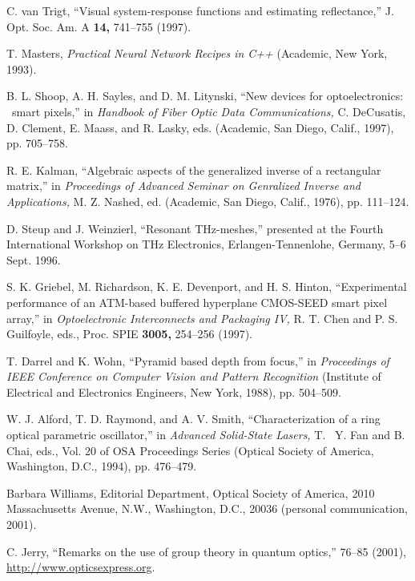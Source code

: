 \documentclass[letterpaper,11pt]{article}   %
\begin{document}
\begin{thebibliography}{99}

C. van Trigt, ``Visual system-response functions and estimating reflectance,'' %
J. Opt. Soc. Am. A {\bf 14,} 741--755 (1997).

T. Masters, {\it Practical Neural Network Recipes in C++} (Academic,
New York, 1993).

B. L. Shoop, A. H. Sayles, and D. M. Litynski, ``New devices for
optoelectronics:  \ smart pixels,'' in {\it Handbook of Fiber
Optic Data Communications,} C. DeCusatis, D. Clement, E. Maass,
and R. Lasky, eds. (Academic, San Diego, Calif., 1997), pp.
705--758.

R. E. Kalman, ``Algebraic aspects of the generalized inverse of a
rectangular matrix,'' in {\it Proceedings of Advanced Seminar on
Genralized Inverse and Applications,} M. Z. Nashed, ed. (Academic,
San Diego, Calif., 1976), pp. 111--124.

D. Steup and J. Weinzierl, ``Resonant THz-meshes,'' presented at the
Fourth International Workshop on THz Electronics,
Erlangen-Tennenlohe, Germany, 5--6 Sept. 1996.

 S. K. Griebel, M. Richardson, K. E. Devenport, and H. S. Hinton,
``Experimental performance of an ATM-based buffered hyperplane
CMOS-SEED smart pixel array,'' in {\it Optoelectronic
Interconnects and Packaging IV,} R. T. Chen and P. S. Guilfoyle,
eds., Proc. SPIE {\bf 3005,} 254--256 (1997).

T. Darrel and K. Wohn, ``Pyramid based depth from focus,'' in
{\it Proceedings of IEEE Conference on Computer Vision and Pattern
Recognition} (Institute of Electrical and Electronics Engineers,
New York, 1988), pp. 504--509.

 W. J. Alford, T. D. Raymond, and A. V. Smith, ``Characterization of a ring optical
parametric oscillator,'' in {\it Advanced Solid-State Lasers,} T.~
Y. Fan and B. Chai, eds., Vol. 20 of OSA Proceedings Series
(Optical Society of America, Washington, D.C., 1994), pp.
476--479.

Barbara Williams, Editorial Department, Optical Society of
America, 2010 Massa\-chusetts Avenue, N.W., Washington, D.C.,
20036 (personal communication, 2001).

C. Jerry, ``Remarks on the use of group
theory in quantum optics,''  76--85 (2001),
\href{http://www.opticsexpress.org}{http://www.opticsexpress.org}.

\end{thebibliography}
\end{document}
